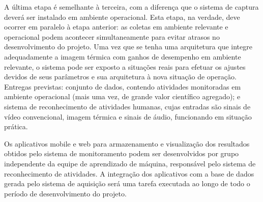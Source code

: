 A última etapa é semelhante à terceira, com a diferença que o sistema de captura deverá ser instalado em ambiente operacional. Esta etapa, na verdade, deve ocorrer em paralelo à etapa anterior: as coletas em ambiente relevante e operacional podem acontecer simultaneamente para evitar atrasos no desenvolvimento do projeto. Uma vez que se tenha uma arquitetura que integre adequadamente a imagem térmica com ganhos de desempenho em ambiente relevante, o sistema pode ser exposto a situações reais para efetuar os ajustes devidos de seus parâmetros e sua arquitetura à nova situação de operação. Entregas previstas: conjunto de dados, contendo atividades monitoradas em ambiente operacional (mais uma vez, de grande valor científico agregado); e sistema de reconhecimento de atividades humanas, cujas entradas são sinais de vídeo convencional, imagem térmica e sinais de áudio, funcionando em situação prática.

Os aplicativos mobile e web para armazenamento e visualização dos resultados obtidos pelo sistema de monitoramento podem ser desenvolvidos por grupo independente da equipe de aprendizado de máquina, responsável pelo sistema de reconhecimento de atividades. A integração dos aplicativos com a base de dados gerada pelo sistema de aquisição será uma tarefa executada ao longo de todo o período de desenvolvimento do projeto.

